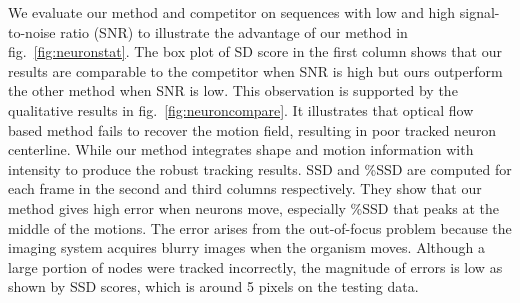 \documentclass{article}
\begin{document}
We evaluate our method and competitor on sequences with low and high signal-to-noise ratio (SNR) to illustrate the advantage of our method in fig.~\ref{fig:neuronstat}. The box plot of SD score in the first column shows that our results are comparable to the competitor when SNR is high but ours outperform the other method when SNR is low. This observation is supported by the qualitative results in fig.~\ref{fig:neuroncompare}. It illustrates that optical flow based method fails to recover the motion field, resulting in poor tracked neuron centerline. While our method integrates shape and motion information with intensity to produce the robust tracking results. SSD and \%SSD are computed for each frame in the second and third columns respectively. They show that our method gives high error when neurons move, especially \%SSD that peaks at the middle of the motions. The error arises from the out-of-focus problem because the imaging system acquires blurry images when the organism moves. Although a large portion of nodes were tracked incorrectly, the magnitude of errors is low as shown by SSD scores, which is around 5 pixels on the testing data.
\end{document}
